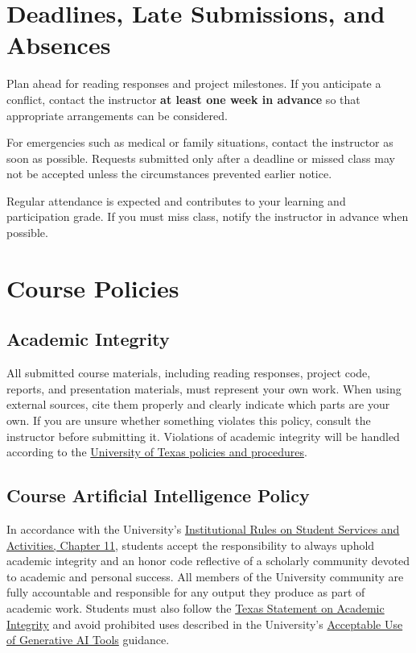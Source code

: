 \documentclass[11pt]{article}
\begin{document}
\section{Deadlines, Late Submissions, and Absences}

Plan ahead for reading responses and project milestones. If you anticipate a
conflict, contact the instructor \textbf{at least one week in advance} so that
appropriate arrangements can be considered.

For emergencies such as medical or family situations, contact the instructor as
soon as possible. Requests submitted only after a deadline or missed class may
not be accepted unless the circumstances prevented earlier notice.

Regular attendance is expected and contributes to your learning and
participation grade. If you must miss class, notify the instructor in advance
when possible.

\section{Course Policies}

\subsection{Academic Integrity}
All submitted course materials, including reading responses, project code,
reports, and presentation materials, must represent your own work. When using
external sources, cite them properly and clearly indicate which parts are your
own. If you are unsure whether something violates this policy, consult the
instructor before submitting it. Violations of academic integrity will be
handled according to the
\href{https://deanofstudents.utexas.edu/conduct/index.php}{University of Texas
policies and procedures}.

\subsection{Course Artificial Intelligence Policy}
In accordance with the University's
\href{https://catalog.utexas.edu/general-information/appendices/appendix-c/student-conduct-and-academic-integrity/}{Institutional
Rules on Student Services and Activities, Chapter 11}, students accept the
responsibility to always uphold academic integrity and an honor code reflective
of a scholarly community devoted to academic and personal success. All members
of the University community are fully accountable and responsible for any
output they produce as part of academic work. Students must also follow the
\href{https://www.utexas.edu/academics/texas-statement-academic-integrity}{Texas
Statement on Academic Integrity} and avoid prohibited uses described in the
University's \href{https://security.utexas.edu/ai-tools}{Acceptable Use of
Generative AI Tools} guidance.
\end{document}
